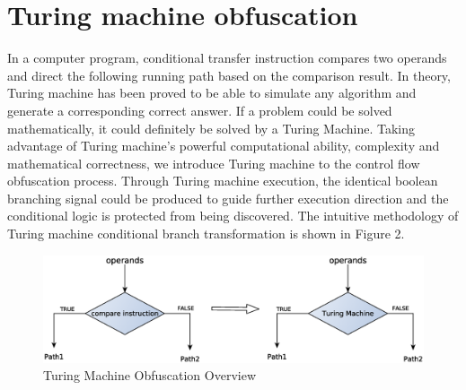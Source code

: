 \documentclass[lnicst]{svmultln}
\begin{document}
%
\section{Turing machine obfuscation}
%
In a computer program, conditional transfer instruction compares two operands and direct the following running path based on the comparison result. In theory, Turing machine has been proved to be able to simulate any algorithm and generate a corresponding correct answer. If a problem could be solved mathematically, it could definitely be solved by a Turing Machine. Taking advantage of Turing machine's powerful computational ability, complexity and mathematical correctness, we introduce Turing machine to the control flow obfuscation process. Through Turing machine execution, the identical boolean branching signal could be produced to guide further execution direction and the conditional logic is protected from being discovered. The intuitive methodology of Turing machine conditional branch transformation is shown in Figure 2.
\begin{figure}
 \includegraphics[width=\linewidth]{figure2.eps}
 \caption{Turing Machine Obfuscation Overview}
 \label{Figure 2}
\end{figure}
\end{document}

